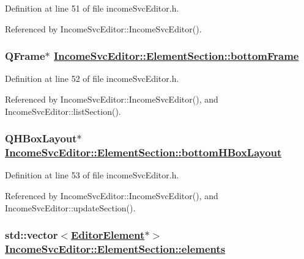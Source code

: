 Definition at line 51 of file income\-Svc\-Editor.h.

Referenced by Income\-Svc\-Editor::Income\-Svc\-Editor().\hypertarget{structIncomeSvcEditor_1_1ElementSection_o4}{
\subsubsection[bottomFrame]{\setlength{\rightskip}{0pt plus 5cm}QFrame$\ast$ \hyperlink{structIncomeSvcEditor_1_1ElementSection_o4}{Income\-Svc\-Editor::Element\-Section::bottom\-Frame}}}
\label{structIncomeSvcEditor_1_1ElementSection_o4}


Definition at line 52 of file income\-Svc\-Editor.h.

Referenced by Income\-Svc\-Editor::Income\-Svc\-Editor(), and Income\-Svc\-Editor::list\-Section().\hypertarget{structIncomeSvcEditor_1_1ElementSection_o5}{
\subsubsection[bottomHBoxLayout]{\setlength{\rightskip}{0pt plus 5cm}QHBox\-Layout$\ast$ \hyperlink{structIncomeSvcEditor_1_1ElementSection_o5}{Income\-Svc\-Editor::Element\-Section::bottom\-HBox\-Layout}}}
\label{structIncomeSvcEditor_1_1ElementSection_o5}


Definition at line 53 of file income\-Svc\-Editor.h.

Referenced by Income\-Svc\-Editor::Income\-Svc\-Editor(), and Income\-Svc\-Editor::update\-Section().\hypertarget{structIncomeSvcEditor_1_1ElementSection_o8}{
\subsubsection[elements]{\setlength{\rightskip}{0pt plus 5cm}std::vector$<$\hyperlink{classEditorElement}{Editor\-Element}$\ast$$>$ \hyperlink{structIncomeSvcEditor_1_1ElementSection_o8}{Income\-Svc\-Editor::Element\-Section::elements}}}
\label{structIncomeSvcEditor_1_1ElementSection_o8}


